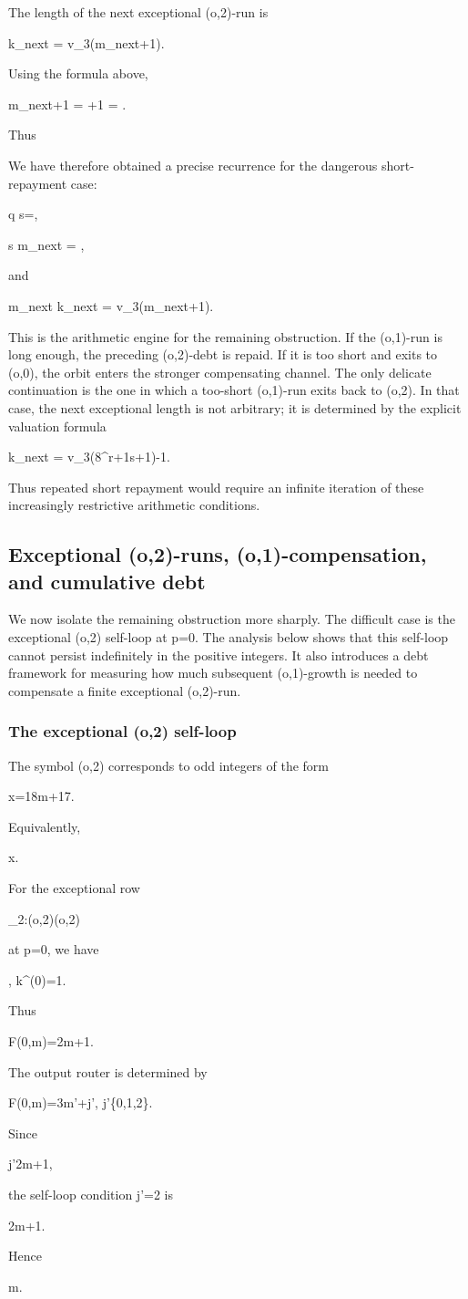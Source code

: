 \documentclass[11pt,letterpaper]{amsart}
\def\mathrm#1{#1}%
\def\({}%
\def\){}%
\def\[{ }%
\def\]{ }%
\theoremstyle{definition}
\theoremstyle{plain}
\theoremstyle{plain}
\theoremstyle{remark}
\begin{document}
The length of the next exceptional \((o,2)\)-run is
\[
k_{\mathrm{next}}
=
v_3(m_{\mathrm{next}}+1).
\]
Using the formula above,
\[
m_{\mathrm{next}}+1
=
+1
=
.
\]
Thus
\[
\boxed{
k_{\mathrm{next}}
=
v_3(8^{r+1}s+1)-1.
}
\]

We have therefore obtained a precise recurrence for the dangerous
short-repayment case:
\[
q
\longmapsto
s=,
\]
\[
s
\longmapsto
m_{\mathrm{next}}
=
,
\]
and
\[
m_{\mathrm{next}}
\longmapsto
k_{\mathrm{next}}
=
v_3(m_{\mathrm{next}}+1).
\]

This is the arithmetic engine for the remaining obstruction.  If the
\((o,1)\)-run is long enough, the preceding \((o,2)\)-debt is repaid.  If
it is too short and exits to \((o,0)\), the orbit enters the stronger
compensating channel.  The only delicate continuation is the one in
which a too-short \((o,1)\)-run exits back to \((o,2)\).  In that case,
the next exceptional length is not arbitrary; it is determined by the
explicit valuation formula
\[
k_{\mathrm{next}}
=
v_3(8^{r+1}s+1)-1.
\]
Thus repeated short repayment would require an infinite iteration of
these increasingly restrictive arithmetic conditions.

\subsection{Exceptional \((o,2)\)-runs, \((o,1)\)-compensation, and cumulative debt}
\label{subsec:o2-o1-debt-analysis}

We now isolate the remaining obstruction more sharply.  The difficult
case is the exceptional \((o,2)\) self-loop at \(p=0\).  The analysis
below shows that this self-loop cannot persist indefinitely in the
positive integers.  It also introduces a debt framework for measuring
how much subsequent \((o,1)\)-growth is needed to compensate a finite
exceptional \((o,2)\)-run.

\subsubsection{The exceptional \((o,2)\) self-loop}

The symbol \((o,2)\) corresponds to odd integers of the form
\[
x=18m+17.
\]
Equivalently,
\[
x.
\]

For the exceptional row
\[
\Omega_2:(o,2)\to(o,2)
\]
at \(p=0\), we have
\[
,
\qquad
k^{(0)}=1.
\]
Thus
\[
F(0,m)=2m+1.
\]
The output router is determined by
\[
F(0,m)=3m'+j',
\qquad
j'\in\{0,1,2\}.
\]
Since
\[
j'\equiv 2m+1,
\]
the self-loop condition \(j'=2\) is
\[
2m+1.
\]
Hence
\[
m.
\]
\end{document}
